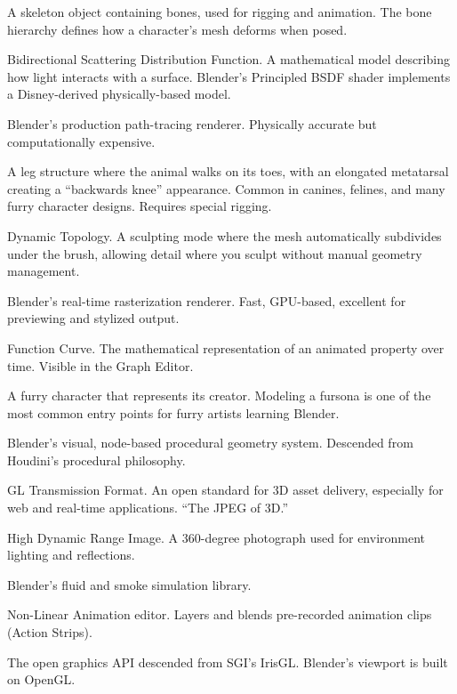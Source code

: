 \documentclass[11pt,letterpaper,twoside,openright]{book}
\begin{document}
\begin{description}[leftmargin=2em, style=nextline]
  \item[\textsf{Armature}] A skeleton object containing bones, used for rigging and animation. The bone hierarchy defines how a character's mesh deforms when posed.
  \item[\textsf{BSDF}] Bidirectional Scattering Distribution Function. A mathematical model describing how light interacts with a surface. Blender's Principled BSDF shader implements a Disney-derived physically-based model.
  \item[\textsf{Cycles}] Blender's production path-tracing renderer. Physically accurate but computationally expensive.
  \item[\textsf{Digitigrade}] A leg structure where the animal walks on its toes, with an elongated metatarsal creating a ``backwards knee'' appearance. Common in canines, felines, and many furry character designs. Requires special rigging.
  \item[\textsf{Dyntopo}] Dynamic Topology. A sculpting mode where the mesh automatically subdivides under the brush, allowing detail where you sculpt without manual geometry management.
  \item[\textsf{EEVEE}] Blender's real-time rasterization renderer. Fast, GPU-based, excellent for previewing and stylized output.
  \item[\textsf{F-Curve}] Function Curve. The mathematical representation of an animated property over time. Visible in the Graph Editor.
  \item[\textsf{Fursona}] A furry character that represents its creator. Modeling a fursona is one of the most common entry points for furry artists learning Blender.
  \item[\textsf{Geometry Nodes}] Blender's visual, node-based procedural geometry system. Descended from Houdini's procedural philosophy.
  \item[\textsf{glTF}] GL Transmission Format. An open standard for 3D asset delivery, especially for web and real-time applications. ``The JPEG of 3D.''
  \item[\textsf{HDRI}] High Dynamic Range Image. A 360-degree photograph used for environment lighting and reflections.
  \item[\textsf{Mantaflow}] Blender's fluid and smoke simulation library.
  \item[\textsf{NLA Editor}] Non-Linear Animation editor. Layers and blends pre-recorded animation clips (Action Strips).
  \item[\textsf{OpenGL}] The open graphics API descended from SGI's IrisGL. Blender's viewport is built on OpenGL.

\end{description}
\end{document}
